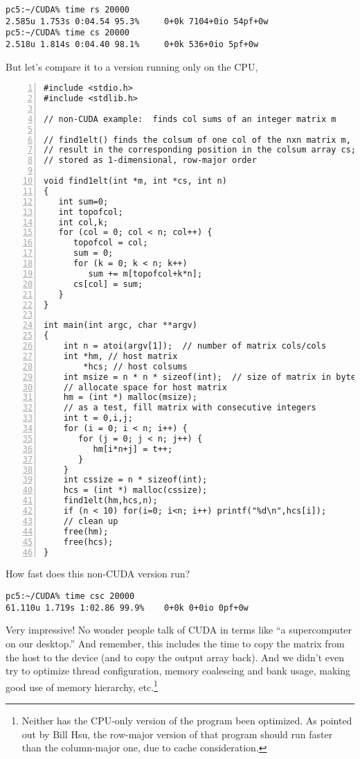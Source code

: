 \begin{Verbatim}[fontsize=\relsize{-2}]
pc5:~/CUDA% time rs 20000
2.585u 1.753s 0:04.54 95.3%     0+0k 7104+0io 54pf+0w
pc5:~/CUDA% time cs 20000
2.518u 1.814s 0:04.40 98.1%     0+0k 536+0io 5pf+0w
\end{Verbatim}

But let's compare it to a version running only on the CPU,

\begin{lstlisting}[numbers=left]
#include <stdio.h>
#include <stdlib.h>

// non-CUDA example:  finds col sums of an integer matrix m

// find1elt() finds the colsum of one col of the nxn matrix m, storing the
// result in the corresponding position in the colsum array cs; matrix
// stored as 1-dimensional, row-major order

void find1elt(int *m, int *cs, int n)
{
   int sum=0;
   int topofcol;
   int col,k;
   for (col = 0; col < n; col++) {
      topofcol = col;
      sum = 0;
      for (k = 0; k < n; k++)
         sum += m[topofcol+k*n];
      cs[col] = sum;
   }
}

int main(int argc, char **argv)
{
    int n = atoi(argv[1]);  // number of matrix cols/cols
    int *hm, // host matrix
        *hcs; // host colsums
    int msize = n * n * sizeof(int);  // size of matrix in bytes
    // allocate space for host matrix
    hm = (int *) malloc(msize);  
    // as a test, fill matrix with consecutive integers
    int t = 0,i,j;
    for (i = 0; i < n; i++) {
       for (j = 0; j < n; j++) {
          hm[i*n+j] = t++;
       }
    }
    int cssize = n * sizeof(int);
    hcs = (int *) malloc(cssize);  
    find1elt(hm,hcs,n);
    if (n < 10) for(i=0; i<n; i++) printf("%d\n",hcs[i]);
    // clean up
    free(hm);
    free(hcs);
}
\end{lstlisting}

How fast does this non-CUDA version run?

\begin{Verbatim}[fontsize=\relsize{-2}]
pc5:~/CUDA% time csc 20000
61.110u 1.719s 1:02.86 99.9%    0+0k 0+0io 0pf+0w
\end{Verbatim}

Very impressive!  No wonder people talk of CUDA in terms like ``a
supercomputer on our desktop.''  And remember, this includes the time to
copy the matrix from the host to the device (and to copy the output
array back).  And we didn't even try to optimize thread configuration,
memory coalescing and bank usage, making good use of memory hierarchy,
etc.\footnote{Neither has the CPU-only version of the program been
optimized.  As pointed out by Bill Hsu, the row-major version of that
program should run faster than the column-major one, due to cache
consideration.}

